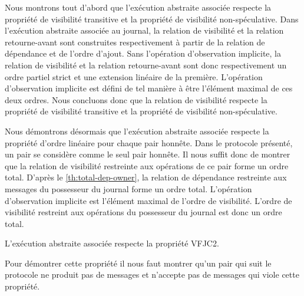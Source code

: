 Nous montrons tout d'abord que l'exécution abstraite associée respecte la propriété de visibilité transitive et la propriété de visibilité non-spéculative.
Dans l'exécution abstraite associée au journal, la relation de visibilité et la relation retourne-avant sont construites respectivement à partir de la relation de dépendance et de l'ordre d'ajout.
Sans l'opération d'observation implicite, la relation de visibilité et la relation retourne-avant sont donc respectivement un ordre partiel strict et une extension linéaire de la première.
L'opération d'observation implicite est défini de tel manière à être l'élément maximal de ces deux ordres.
Nous concluons donc que la relation de visibilité respecte la propriété de visibilité transitive et la propriété de visibilité non-spéculative.

Nous démontrons désormais que l'exécution abstraite associée respecte la propriété d'ordre linéaire pour chaque pair honnête.
Dans le protocole présenté, un pair se considère comme le seul pair honnête.
Il nous suffit donc de montrer que la relation de visibilité restreinte aux opérations de ce pair forme un ordre total.
D'après le \autoref{th:total-dep-owner}, la relation de dépendance restreinte aux messages du possesseur du journal forme un ordre total.
L'opération d'observation implicite est l'élément maximal de l'ordre de visibilité.
L'ordre de visibilité restreint aux opérations du possesseur du journal est donc un ordre total.

L'exécution abstraite associée respecte la propriété VFJC2.

Pour démontrer cette propriété il nous faut montrer qu'un pair qui suit le protocole ne produit pas de messages et n'accepte pas de messages qui viole cette propriété.

